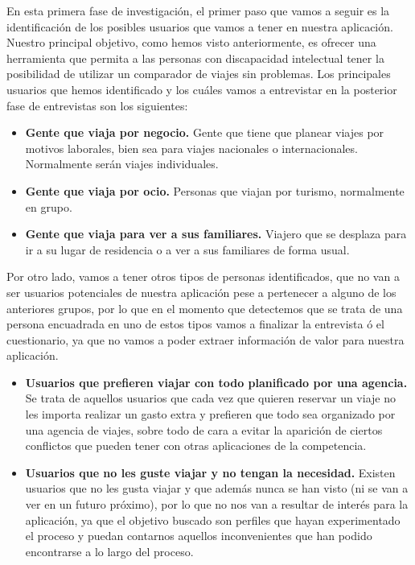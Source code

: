 En esta primera fase de investigación, el primer paso que vamos a seguir es la identificación de los posibles usuarios que vamos a tener
en nuestra aplicación. Nuestro principal objetivo, como hemos visto anteriormente, es ofrecer una herramienta que permita a las personas con
discapacidad intelectual tener la posibilidad de utilizar un comparador de viajes sin problemas. Los principales usuarios que hemos identificado
y los cuáles vamos a entrevistar en la posterior fase de entrevistas son los siguientes:

\begin{itemize}
    \item\textbf{Gente que viaja por negocio.} Gente que tiene que planear viajes por motivos laborales, bien sea para viajes nacionales o internacionales. Normalmente serán viajes individuales.
    \item\textbf{Gente que viaja por ocio.} Personas que viajan por turismo, normalmente en grupo.
    \item\textbf{Gente que viaja para ver a sus familiares.} Viajero que se desplaza para ir a su lugar de residencia o a ver a sus familiares de forma usual.
\end{itemize}

Por otro lado, vamos a tener otros tipos de personas identificados, que no van a ser usuarios potenciales de nuestra aplicación pese a pertenecer a 
alguno de los anteriores grupos, por lo que en el momento que detectemos que se trata de una persona encuadrada en uno de estos tipos
vamos a finalizar la entrevista ó el cuestionario, ya que no vamos a poder extraer información de valor para nuestra aplicación.


\begin{itemize}
    \item {\textbf{Usuarios que prefieren viajar con todo planificado por una agencia.}} Se trata de aquellos usuarios que cada vez que quieren
        reservar un viaje no les importa realizar un gasto extra y prefieren que todo sea organizado por una agencia de viajes, sobre todo de cara a
        evitar la aparición de ciertos conflictos que pueden tener con otras aplicaciones de la competencia.
    \item {\textbf{Usuarios que no les guste viajar y no tengan la necesidad.}} Existen usuarios que no les gusta viajar y que además nunca se han visto
        (ni se van a ver en un futuro próximo), por lo que no nos van a resultar de interés para la aplicación, ya que el objetivo buscado son perfiles que
        hayan experimentado el proceso y puedan contarnos aquellos inconvenientes que han podido encontrarse a lo largo del proceso.
\end{itemize}
 
